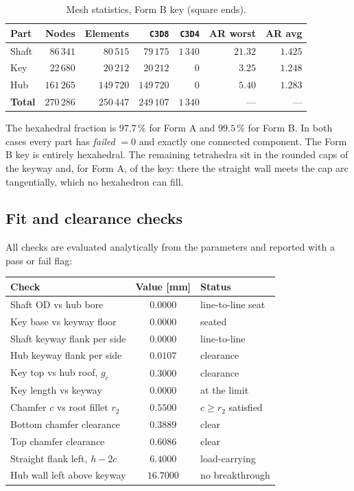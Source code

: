 \documentclass[11pt,a4paper]{article}
\newcommand{\id}[1]{\texttt{#1}}
\begin{document}
\begin{table}[H]
\centering
\caption{Mesh statistics, Form B key (square ends).}
\begin{tabular}{lrrrrrr}
\toprule
Part & Nodes & Elements & \id{C3D8} & \id{C3D4} & AR worst & AR avg \\
\midrule
Shaft & $86\,341$ & $80\,515$ & $79\,175$ & $1\,340$ & $21.32$ & $1.425$ \\
Key   & $22\,680$ & $20\,212$ & $20\,212$ & $0$ & $3.25$ & $1.248$ \\
Hub   & $161\,265$ & $149\,720$ & $149\,720$ & $0$ & $5.40$ & $1.283$ \\
\midrule
\textbf{Total} & $270\,286$ & $250\,447$ & $249\,107$ & $1\,340$ & --- & --- \\
\bottomrule
\end{tabular}
\end{table}

\noindent
The hexahedral fraction is $97.7\,\%$ for Form A and $99.5\,\%$ for Form B. In
both cases every part has \emph{failed} $= 0$ and exactly one connected
component. The Form B key is entirely hexahedral. The remaining tetrahedra sit
in the rounded caps of the keyway and, for Form A, of the key: there the straight
wall meets the cap arc tangentially, which no hexahedron can fill.

\subsection{Fit and clearance checks}
All checks are evaluated analytically from the parameters and reported with a
pass or fail flag:

\begin{center}
\begin{tabular}{lcl}
\toprule
Check & Value [mm] & Status \\
\midrule
Shaft OD vs hub bore & $0.0000$ & line-to-line seat \\
Key base vs keyway floor & $0.0000$ & seated \\
Shaft keyway flank per side & $0.0000$ & line-to-line \\
Hub keyway flank per side & $0.0107$ & clearance \\
Key top vs hub roof, $g_c$ & $0.3000$ & clearance \\
Key length vs keyway & $0.0000$ & at the limit \\
Chamfer $c$ vs root fillet $r_2$ & $0.5500$ & $c \ge r_2$ satisfied \\
Bottom chamfer clearance & $0.3889$ & clear \\
Top chamfer clearance & $0.6086$ & clear \\
Straight flank left, $h-2c$ & $6.4000$ & load-carrying \\
Hub wall left above keyway & $16.7000$ & no breakthrough \\
\bottomrule
\end{tabular}
\end{center}
\end{document}
